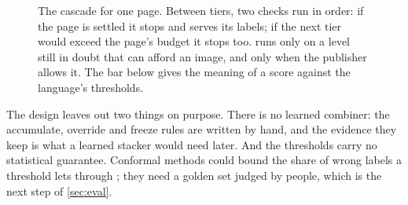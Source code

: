 \begin{figure}[t]
\caption{The cascade for one page. Between tiers, two checks run in order: if the page is settled it stops and serves its labels; if the next tier would exceed the page's budget it stops too.  runs only on a level still in doubt that can afford an image, and  only when the publisher allows it. The bar below gives the meaning of a score against the language's thresholds.}
\label{fig:cascade-flow}
\end{figure}

The design leaves out two things on purpose. There is no learned combiner: the accumulate, override and freeze rules are written by hand, and the evidence they keep is what a learned stacker would need later. And the thresholds carry no statistical guarantee. Conformal methods could bound the share of wrong labels a threshold lets through \citep{angelopoulos2024conformal,angelopoulos2021learn}; they need a golden set judged by people, which is the next step of \cref{sec:eval}.
